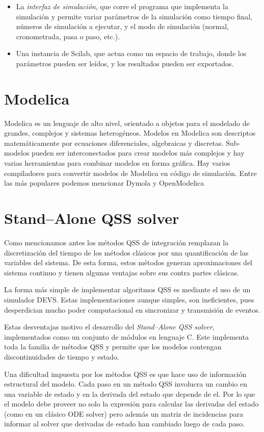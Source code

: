 \documentclass[a4paper,	11pt]{report}
\begin{document}
\begin{itemize}
\item La \emph{interfaz de simulación}, que corre el programa que implementa la simulación y permite variar parámetros de la simulación como tiempo final, números de simulación a ejecutar, y el modo de simulación (normal, cronometrada, pasa o paso, etc.).

\item Una instancia de Scilab, que actua como un espacio de trabajo, donde los parámetros pueden ser leídos, y los resultados pueden ser exportados.
\end{itemize}

\section{Modelica}
Modelica es un lenguaje de alto nivel, orientado a objetos para el modelado de grandes, complejos y sistemas heterogéneos.
Modelos en Modelica son descriptos matemáticamente por ecuaciones diferenciales, algebraicas y discretas. Sub-modelos pueden ser interconectados para crear modelos más complejos y hay varias herramientas para combinar modelos en forma gráfica. 
Hay varios compiladores para convertir modelos de Modelica en código de simulación. Entre las más populares podemos mencionar Dymola y OpenModelica

\section{Stand–Alone QSS solver}
Como mencionamos antes los métodos QSS de integración remplazan la discretización del tiempo de los métodos clásicos por una quantificación de las variables del sistema. De esta forma, estos métodos generan aproximaciones del sistema continuo y tienen algunas ventajas sobre sus contra partes clásicas.

La forma más simple de implementar algoritmos QSS es mediante el uso de un simulador DEVS. Estas implementaciones aunque simples, son ineficientes, pues desperdician mucho poder computacional en sincronizar y transmisión de eventos.

Estas desventajas motivo el desarrollo del \emph{Stand–Alone QSS solver}, implementados como un conjunto de módulos en lenguaje C. Este implementa toda la familia de métodos QSS y permite que los modelos contengan discontinuidades de tiempo y estado.

Una dificultad impuesta por los métodos QSS es que hace uso de información estructural del modelo. Cada paso en un método QSS involucra un cambio en una variable de estado y en la derivada del estado que depende de el. Por lo que el modelo debe proveer no solo la expresión para calcular las derivadas del estado (como en un clásico ODE solver) pero además un matriz de incidencias para informar al solver que derivadas de estado han cambiado luego de cada paso.
\end{document}
